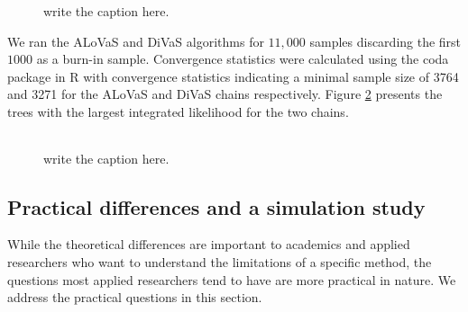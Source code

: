 \begin{figure}
\begin{center} 
\begin{tabular}{cc}
\end{tabular}
\caption{write the caption here.}
\label{fig:interaction_trees}
\end{center}
\end{figure} 

We ran the ALoVaS and DiVaS algorithms for $11,000$ samples discarding the first $1000$ as a burn-in sample. Convergence statistics were calculated using the coda package in R with convergence statistics indicating a minimal sample size of 3764 and 3271 for the ALoVaS and DiVaS chains respectively. Figure \ref{fig:chain_max_interaction_tree} presents the trees with the largest integrated likelihood for the two chains.  

\begin{figure}
\begin{center} 
\begin{tabular}{cc}
\end{tabular}
\caption{write the caption here.}
\label{fig:chain_max_interaction_tree}
\end{center}
\end{figure} 

\subsection{Practical differences and a simulation study}

While the theoretical differences are important to academics and applied researchers who want to understand the limitations of a specific method, the questions most applied researchers tend to have are more practical in nature. We address the practical questions in this section. 

